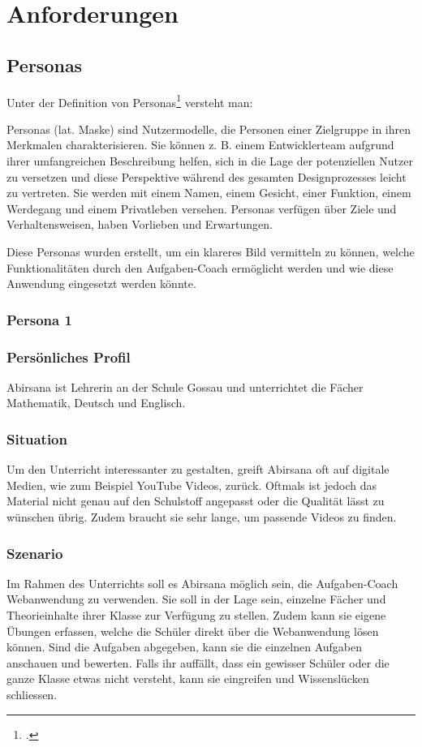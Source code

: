 \section{Anforderungen}

\subsection{Personas}
Unter der Definition von Personas\footcite{persona_definition} versteht man: 
\begin{displayquote}
Personas (lat. Maske) sind Nutzermodelle, die Personen einer Zielgruppe in ihren Merkmalen charakterisieren. Sie können z. B. einem Entwicklerteam aufgrund ihrer umfangreichen Beschreibung helfen, sich in die Lage der potenziellen Nutzer zu versetzen und diese Perspektive während des gesamten Designprozesses leicht zu vertreten. Sie werden mit einem Namen, einem Gesicht, einer Funktion, einem Werdegang und einem Privatleben versehen. Personas verfügen über Ziele und Verhaltensweisen, haben Vorlieben und Erwartungen.
\end{displayquote}

Diese Personas wurden erstellt, um ein klareres Bild vermitteln zu können, welche Funktionalitäten durch den Aufgaben-Coach ermöglicht werden und wie diese Anwendung eingesetzt werden könnte.

\subsubsection{Persona 1}
\subsubsection*{Persönliches Profil}
Abirsana ist Lehrerin an der Schule Gossau und unterrichtet die Fächer Mathematik, Deutsch und Englisch.

\subsubsection*{Situation}
Um den Unterricht interessanter zu gestalten, greift Abirsana oft auf digitale Medien, wie zum Beispiel YouTube Videos, zurück. Oftmals ist jedoch das Material nicht genau auf den Schulstoff angepasst oder die Qualität lässt zu wünschen übrig. Zudem braucht sie sehr lange, um passende Videos zu finden.

\subsubsection*{Szenario}
Im Rahmen des Unterrichts soll es Abirsana möglich sein, die Aufgaben-Coach Webanwendung zu verwenden. Sie soll in der Lage sein, einzelne Fächer und Theorieinhalte ihrer Klasse zur Verfügung zu stellen. Zudem kann sie eigene Übungen erfassen, welche die Schüler direkt über die Webanwendung lösen können. Sind die Aufgaben abgegeben, kann sie die einzelnen Aufgaben anschauen und bewerten. Falls ihr auffällt, dass ein gewisser Schüler oder die ganze Klasse etwas nicht versteht, kann sie eingreifen und Wissenslücken schliessen.


